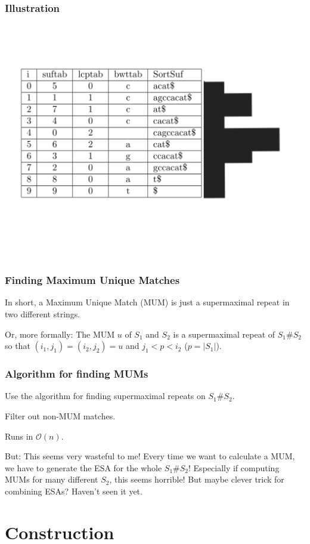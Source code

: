 \documentclass[compress,handout]{beamer} %
\renewcommand{\O}{\mathcal{O}}
\begin{document}
\begin{frame}
	\frametitle{Illustration}
	\includegraphics[width=\textwidth, height=\textheight, keepaspectratio=true]{local_maxima}
\end{frame}

\begin{frame}
	\frametitle{Finding Maximum Unique Matches}
	In short, a Maximum Unique Match (MUM) is just a supermaximal
	repeat in two different strings.

	Or, more formally: The MUM $u$ of $S_1$ and $S_2$
	is a supermaximal repeat of $S_1\#S_2$ so that
	$(i_1,j_1)=(i_2,j_2)=u$ and $j_1<p<i_2$ ($p=|S_1|$).
\end{frame}

\begin{frame}
	\frametitle{Algorithm for finding MUMs}
	Use the algorithm for finding supermaximal repeats on $S_1\#S_2$.

	Filter out non-MUM matches.

	Runs in $\O(n)$.

	But: This seems very wasteful to me! Every time we want to
	calculate a MUM, we have to generate the ESA for the whole
	$S_1\#S_2$! Especially if computing MUMs for many different
	$S_2$, this seems horrible! But maybe clever trick for combining
	ESAs? Haven't seen it yet.
\end{frame}

\section{Construction}
\end{document}
